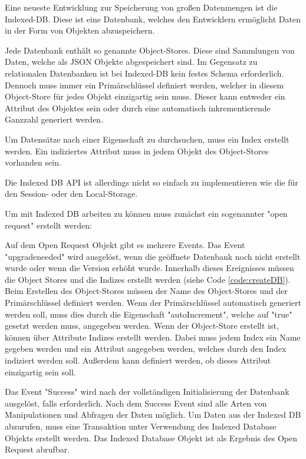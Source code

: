 
Eine neueste Entwicklung zur Speicherung von großen Datenmengen ist die Indexed-DB. 
Diese ist eine Datenbank, welches den Entwicklern ermöglicht Daten in der Form von Objekten abzuspeichern.

Jede Datenbank enthält so genannte Object-Stores. Diese sind Sammlungen von Daten, welche als JSON Objekte abgespeichert sind. 
Im Gegensatz zu relationalen Datenbanken ist bei Indexed-DB kein festes Schema erforderlich. 
Dennoch muss immer ein Primärschlüssel definiert werden, welcher in diesem Object-Store für jedes Objekt einzigartig sein muss.
Dieser kann entweder ein Attribut des Objektes sein oder durch eine automatisch inkrementierende Ganzzahl generiert werden. 

Um Datensätze nach einer Eigenschaft zu durchsuchen, muss ein Index erstellt werden. Ein indiziertes Attribut muss in jedem Objekt des Object-Stores vorhanden sein.

Die Indexed DB API ist allerdings nicht so einfach zu implementieren wie die für den Session- oder den Local-Storage. 

Um mit Indexed DB arbeiten zu können muss zunächst ein sogenannter "open request" erstellt werden:


Auf dem Open Request Objekt gibt es mehrere Events. 
Das Event "upgradeneeded" wird ausgelöst, wenn die geöffnete Datenbank noch nicht erstellt wurde oder wenn die Version erhöht wurde. 
Innerhalb dieses Ereignisses müssen die Object Stores und die Indizes erstellt werden (siehe Code \ref{code:createDB}). 
Beim Erstellen des Object-Stores müssen der Name des Object-Stores und der Primärschlüssel definiert werden. Wenn der Primärschlüssel automatisch generiert werden soll, muss dies durch die Eigenschaft "autoIncrement", welche auf "true" gesetzt werden muss, angegeben werden.
Wenn der Object-Store erstellt ist, können über Attribute Indizes erstellt werden. Dabei muss jedem Index ein Name gegeben werden und ein Attribut angegeben werden, welches durch den Index indiziert werden soll. Außerdem kann definiert werden, ob dieses Attribut einzigartig sein soll.


Das Event "Success" wird nach der vollständigen Initialisierung der Datenbank ausgelöst, falls erforderlich. Nach dem Success Event sind alle Arten von Manipulationen und Abfragen der Daten möglich. Um Daten aus der Indexed DB abzurufen, muss eine Transaktion unter Verwendung des Indexed Database Objekts erstellt werden. Das Indexed Database Objekt ist als Ergebnis des Open Request abrufbar.

